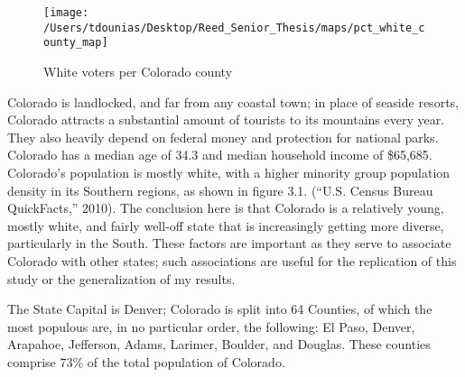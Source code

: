 \documentclass[12pt,twoside]{reedthesis}
\begin{document}
  \begin{figure}
  
  {\centering \texttt{[image: /Users/tdounias/Desktop/Reed\_Senior\_Thesis/maps/pct\_white\_county\_map]} 
  
  }
  
  \caption[White voters per Colorado county]{White voters per Colorado county}\label{fig:white pct map}
  \end{figure}
  
  Colorado is landlocked, and far from any coastal town; in place of
  seaside resorts, Colorado attracts a substantial amount of tourists to
  its mountains every year. They also heavily depend on federal money and
  protection for national parks. Colorado has a median age of 34.3 and
  median household income of \$65,685. Colorado's population is mostly
  white, with a higher minority group population density in its Southern
  regions, as shown in figure 3.1. (``U.S. Census Bureau QuickFacts,''
  2010). The conclusion here is that Colorado is a relatively young,
  mostly white, and fairly well-off state that is increasingly getting
  more diverse, particularly in the South. These factors are important as
  they serve to associate Colorado with other states; such associations
  are useful for the replication of this study or the generalization of my
  results.
  
  The State Capital is Denver; Colorado is split into 64 Counties, of
  which the most populous are, in no particular order, the following: El
  Paso, Denver, Arapahoe, Jefferson, Adams, Larimer, Boulder, and Douglas.
  These counties comprise 73\% of the total population of Colorado.
  
\end{document}
